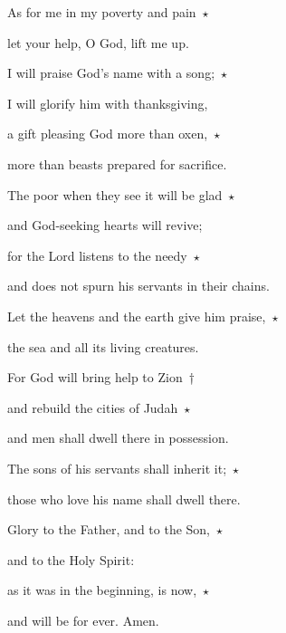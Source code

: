 \noindent As for me in my poverty and pain~$\star$~\nopagebreak

let your help, O God, lift me up.

\noindent I will praise God’s name with a song;~$\star$~\nopagebreak

I will glorify him with thanksgiving,

\noindent a gift pleasing God more than oxen,~$\star$~\nopagebreak

more than beasts prepared for sacrifice.

\noindent The poor when they see it will be glad~$\star$~\nopagebreak

and God-seeking hearts will revive;

\noindent for the Lord listens to the needy~$\star$~\nopagebreak

and does not spurn his servants in their chains.

\noindent Let the heavens and the earth give him praise,~$\star$~\nopagebreak

the sea and all its living creatures.

\noindent For God will bring help to Zion~†~\nopagebreak

and rebuild the cities of Judah~$\star$~\nopagebreak

and men shall dwell there in possession.

\noindent The sons of his servants shall inherit it;~$\star$~\nopagebreak

those who love his name shall dwell there.

\noindent Glory to the Father, and to the Son,~$\star$~\nopagebreak

and to the Holy Spirit:

\noindent as it was in the beginning, is now,~$\star$~\nopagebreak

and will be for ever. Amen.

